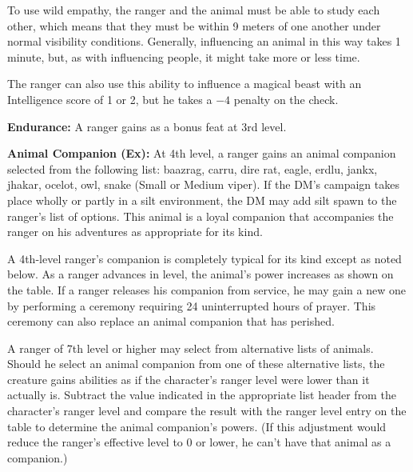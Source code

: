 To use wild empathy, the ranger and the animal must be able to study each other, which means that they must be within 9 meters of one another under normal visibility conditions. Generally, influencing an animal in this way takes 1 minute, but, as with influencing people, it might take more or less time.

The ranger can also use this ability to influence a magical beast with an Intelligence score of 1 or 2, but he takes a $-4$ penalty on the check.


\textbf{Endurance:} A ranger gains  as a bonus feat at 3rd level.


\textbf{Animal Companion (Ex):} At 4th level, a ranger gains an animal companion selected from the following list: baazrag, carru, dire rat, eagle, erdlu, jankx, jhakar, ocelot, owl, snake (Small or Medium viper). If the DM's campaign takes place wholly or partly in a silt environment, the DM may add silt spawn to the ranger's list of options. This animal is a loyal companion that accompanies the ranger on his adventures as appropriate for its kind. 

A 4th-level ranger's companion is completely typical for its kind except as noted below. As a ranger advances in level, the animal's power increases as shown on the table. If a ranger releases his companion from service, he may gain a new one by performing a ceremony requiring 24 uninterrupted hours of prayer. This ceremony can also replace an animal companion that has perished.

A ranger of 7th level or higher may select from alternative lists of animals. Should he select an animal companion from one of these alternative lists, the creature gains abilities as if the character's ranger level were lower than it actually is. Subtract the value indicated in the appropriate list header from the character's ranger level and compare the result with the ranger level entry on the table to determine the animal companion's powers. (If this adjustment would reduce the ranger's effective level to 0 or lower, he can't have that animal as a companion.)



